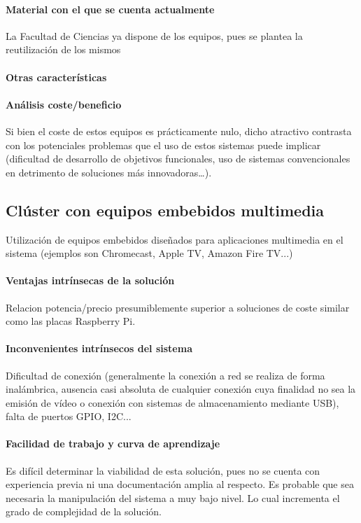 \paragraph{Material con el que se cuenta actualmente}
La Facultad de Ciencias ya dispone de los equipos, pues se plantea la reutilización de los mismos

\paragraph{Otras características}

\paragraph{Análisis coste/beneficio}

Si bien el coste de estos equipos es prácticamente nulo, dicho atractivo contrasta con los potenciales problemas que el uso de estos sistemas puede implicar (dificultad de desarrollo de objetivos funcionales, uso de sistemas convencionales en detrimento de soluciones más innovadoras\dots).

\subsection{Clúster con equipos embebidos multimedia }

Utilización de equipos embebidos diseñados para aplicaciones multimedia en el sistema (ejemplos son Chromecast, Apple TV, Amazon Fire TV...)

\paragraph{Ventajas intrínsecas de la solución}

Relacion potencia/precio presumiblemente superior a soluciones de coste similar como las placas Raspberry Pi.

\paragraph{Inconvenientes intrínsecos del sistema}

Dificultad de conexión (generalmente la conexión a red se realiza de forma inalámbrica, ausencia casi absoluta de cualquier conexión cuya finalidad no sea la emisión de vídeo o conexión con sistemas de almacenamiento mediante USB), falta de puertos GPIO, I2C...

\paragraph{Facilidad de trabajo y curva de aprendizaje}
Es difícil determinar la viabilidad de esta solución, pues no se cuenta con experiencia previa ni una documentación amplia al respecto.
Es probable que sea necesaria la manipulación del sistema a muy bajo nivel. Lo cual incrementa el grado de complejidad de la solución.

